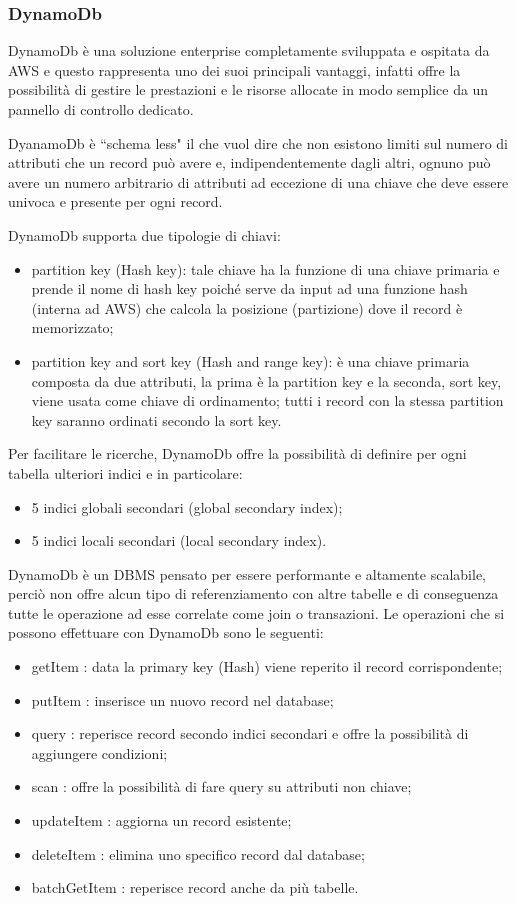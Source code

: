 \subsubsection*{DynamoDb}
DynamoDb è una soluzione enterprise completamente sviluppata e ospitata da AWS e questo rappresenta uno dei suoi principali vantaggi, infatti offre la possibilità di gestire le prestazioni e le risorse allocate in modo semplice da un pannello di controllo dedicato. 

DyanamoDb è ``schema less" il che vuol dire che non esistono limiti sul numero di attributi che un record può avere e, indipendentemente dagli altri, ognuno può avere un numero arbitrario di attributi ad eccezione di una chiave che deve essere univoca e presente per ogni record. 

DynamoDb supporta due tipologie di chiavi:
\begin{itemize}
	\item partition key (Hash key): tale chiave ha la funzione di una chiave primaria e prende il nome di hash key poiché serve da input ad una funzione hash (interna ad AWS) che calcola la posizione (partizione) dove il record è memorizzato;
	\item partition key and sort key (Hash and range key): è una chiave primaria composta da due attributi, la prima è la partition key e la seconda, sort key, viene usata come chiave di ordinamento; tutti i record con la stessa partition key saranno ordinati secondo la sort key. 
\end{itemize}

 Per facilitare le ricerche, DynamoDb offre la possibilità di definire per ogni tabella ulteriori indici e in particolare:

\begin{itemize}
	\item 5 indici globali secondari (global secondary index);
	\item 5 indici locali secondari (local secondary index).
\end{itemize}
DynamoDb è un DBMS pensato per essere performante e altamente scalabile, perciò non offre alcun tipo di referenziamento con altre tabelle e di conseguenza tutte le operazione ad esse correlate come join o transazioni.
Le operazioni che si possono effettuare con DynamoDb sono le seguenti:
\begin{itemize}
	\item getItem : data la primary key (Hash) viene reperito il record corrispondente;
	\item putItem : inserisce un nuovo record nel database;
	\item query : reperisce record secondo indici secondari e offre la possibilità di aggiungere condizioni;
	\item scan : offre la possibilità di fare query su attributi non chiave;
	\item updateItem : aggiorna un record esistente;
	\item deleteItem : elimina uno specifico record dal database;
	\item batchGetItem : reperisce record anche da più tabelle.
\end{itemize}  

